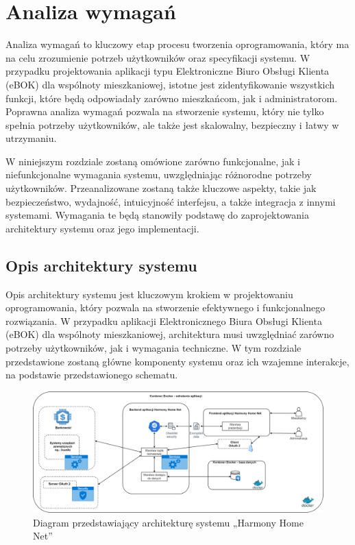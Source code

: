 \chapter{Analiza wymagań}

Analiza wymagań to kluczowy etap procesu tworzenia oprogramowania, który ma na celu zrozumienie potrzeb użytkowników oraz specyfikacji systemu. W przypadku projektowania aplikacji typu Elektroniczne Biuro Obsługi Klienta (eBOK) dla wspólnoty mieszkaniowej, istotne jest zidentyfikowanie wszystkich funkcji, 
które będą odpowiadały zarówno mieszkańcom, jak i administratorom. Poprawna analiza wymagań pozwala na stworzenie systemu, który nie tylko spełnia potrzeby użytkowników, ale także jest skalowalny, bezpieczny i łatwy w utrzymaniu.

W niniejszym rozdziale zostaną omówione zarówno funkcjonalne, jak i niefunkcjonalne wymagania systemu, uwzględniając różnorodne potrzeby użytkowników. Przeanalizowane zostaną także kluczowe aspekty, takie jak bezpieczeństwo, wydajność, intuicyjność interfejsu, a także integracja z innymi systemami. Wymagania te będą stanowiły podstawę do zaprojektowania architektury systemu oraz jego implementacji.

\section{Opis architektury systemu}
Opis architektury systemu jest kluczowym krokiem w projektowaniu oprogramowania, który pozwala na stworzenie efektywnego i funkcjonalnego rozwiązania. W przypadku aplikacji Elektronicznego Biura Obsługi Klienta (eBOK) dla wspólnoty mieszkaniowej, architektura musi uwzględniać zarówno potrzeby użytkowników, jak i wymagania techniczne. W tym rozdziale przedstawione zostaną główne komponenty systemu oraz ich wzajemne interakcje, na podstawie przedstawionego schematu.

\begin{figure}[ht]
    \centering
    \includegraphics[width=1.11\linewidth]{Schematy/zarys_architektury.png}
    \caption{Diagram przedstawiający architekturę systemu „Harmony Home Net”}
    \label{fig:zarys_architektury}
\end{figure}


